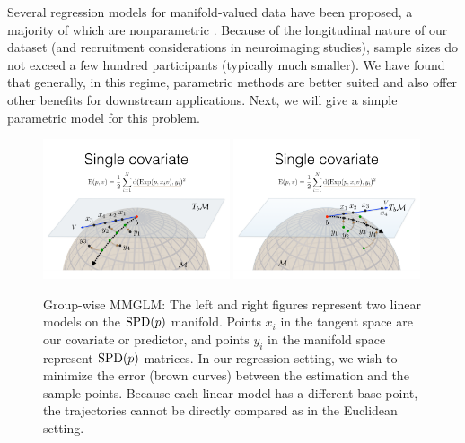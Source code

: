 Several regression models for manifold-valued data have been proposed, a majority of 
which are nonparametric \citep{jayasumanakernel,banerjee2015nonlinear}. 
Because of the longitudinal nature of our dataset (and recruitment considerations in neuroimaging studies),
sample sizes do not exceed a few hundred participants (typically much smaller). 
We have found that generally, in this regime, parametric methods are better suited and also offer other benefits for downstream applications. 
Next, we will give a simple parametric model for this problem. 
\begin{figure}[t]
  \centering
  \includegraphics[width=0.49\textwidth,trim={10 40 10 220},clip]{3_covtraj/figs/MGLM1.png}
    \includegraphics[width=0.49\textwidth,trim={10 40 10 220},clip]{3_covtraj/figs/MGLM2.png}
  \caption[Group-wise comparisons of manifold trajectories]{\label{fig:manifold}Group-wise MMGLM: The left and right figures represent two linear models on the $\text{SPD}(p)$ manifold. Points $x_i$ in the tangent space are our covariate or predictor, and points $y_i$ in the manifold space represent $\text{SPD}(p)$ matrices. In our regression setting, we wish to minimize the error (brown curves) between the estimation and the sample points. Because each linear model has a different base point, the trajectories cannot be directly compared as in the Euclidean setting.}
\end{figure}
